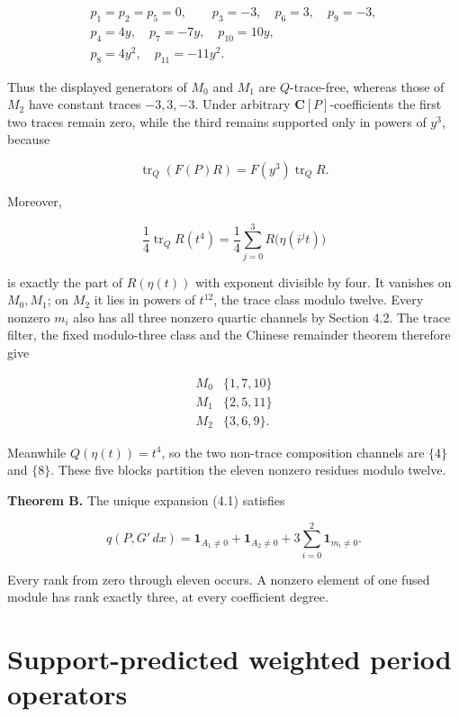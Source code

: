 \documentclass[
  11pt,
  a4paper,
]{amsart}
\begin{document}
\[
\begin{gathered}
p_1=p_2=p_5=0,\qquad p_3=-3,\quad p_6=3,\quad p_9=-3,\\
p_4=4y,\quad p_7=-7y,\quad p_{10}=10y,\\
p_8=4y^2,\quad p_{11}=-11y^2.
\end{gathered}
\]

Thus the displayed generators of \(M_0\) and \(M_1\) are
\(Q\)-trace-free, whereas those of \(M_2\) have constant traces
\(-3,3,-3\). Under arbitrary \(\mathbf C[P]\)-coefficients the first two
traces remain zero, while the third remains supported only in powers of
\(y^3\), because

\[
\operatorname{tr}_Q(F(P)R)=F(y^3)\operatorname{tr}_Q R.
\]

Moreover,

\[
\frac14\operatorname{tr}_Q R(t^4)
=\frac14\sum_{j=0}^3R\bigl(\eta(i^jt)\bigr)
\]

is exactly the part of \(R(\eta(t))\) with exponent divisible by four.
It vanishes on \(M_0,M_1\); on \(M_2\) it lies in powers of \(t^{12}\),
the trace class modulo twelve. Every nonzero \(m_i\) also has all three
nonzero quartic channels by Section 4.2. The trace filter, the fixed
modulo-three class and the Chinese remainder theorem therefore give

\[
\begin{array}{c|c}
M_0 & \{1,7,10\}\\
M_1 & \{2,5,11\}\\
M_2 & \{3,6,9\}.
\end{array}                                             \tag{4.3}
\]

Meanwhile \(Q(\eta(t))=t^4\), so the two non-trace composition channels
are \(\{4\}\) and \(\{8\}\). These five blocks partition the eleven
nonzero residues modulo twelve.

\textbf{Theorem B.} The unique expansion (4.1) satisfies

\[
\boxed{
q(P,G'\,dx)=
\mathbf1_{A_1\ne0}+\mathbf1_{A_2\ne0}
+3\sum_{i=0}^2\mathbf1_{m_i\ne0}.
}                                                        \tag{4.4}
\]

Every rank from zero through eleven occurs. A nonzero element of one
fused module has rank exactly three, at every coefficient degree.

\section{Support-predicted weighted period operators}
\end{document}
